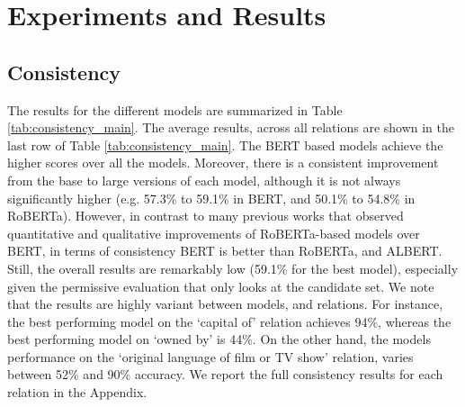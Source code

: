 \section{Experiments and Results}
\label{sec:experiments}




\subsection{Consistency}

The results for the different models are summarized in Table \ref{tab:consistency_main}.
The average results, across all relations are shown in the last row of Table \ref{tab:consistency_main}. The BERT based models achieve the higher scores over all the models. Moreover, there is a consistent improvement from the base to large versions of each model, although it is not always significantly higher (e.g. 57.3\% to 59.1\% in BERT, and 50.1\% to 54.8\% in RoBERTa).
However, in contrast to many previous works that observed quantitative and qualitative improvements of RoBERTa-based models over BERT, in terms of consistency BERT is better than RoBERTa, and ALBERT.
Still, the overall results are remarkably low (59.1\% for the best model), especially given the permissive evaluation that only looks at the candidate set.
We note that the results are highly variant between models, and relations. For instance, the best performing model on the `capital of' relation achieves 94\%, whereas the best performing model on `owned by' is 44\%. 
On the other hand, the models performance on the `original language of film or TV show' relation, varies between 52\% and 90\% accuracy.
We report the full consistency results for each relation in the Appendix.




